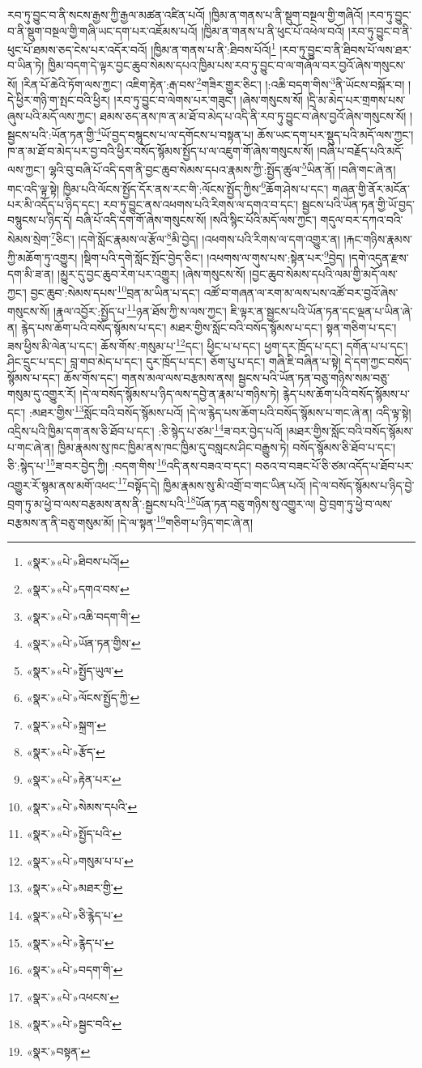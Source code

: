 རབ་ཏུ་བྱུང་བ་ནི་སངས་རྒྱས་ཀྱི་རྒྱལ་མཚན་འཛིན་པའོ། །ཁྱིམ་ན་གནས་པ་ནི་སྡུག་བསྔལ་གྱི་གཞིའོ། །རབ་ཏུ་བྱུང་བ་ནི་སྡུག་བསྔལ་གྱི་གཞི་ཡང་དག་པར་འཇོམས་པའོ། །ཁྱིམ་ན་གནས་པ་ནི་ཕུང་པོ་འཕེལ་བའོ། །རབ་ཏུ་བྱུང་བ་ནི་ཕུང་པོ་ཐམས་ཅད་ངེས་པར་འདོར་བའོ། །ཁྱིམ་ན་གནས་པ་ནི་:ཐིབས་པོའོ།\footnote{«སྣར་»«པེ་»ཐིབས་པའོ།} །རབ་ཏུ་བྱུང་བ་ནི་ཐིབས་པོ་ལས་ཐར་བ་ཡིན་ཏེ། ཁྱིམ་བདག་དེ་ལྟར་བྱང་ཆུབ་སེམས་དཔའ་ཁྱིམ་པས་རབ་ཏུ་བྱུང་བ་ལ་གཞོལ་བར་བྱའོ་ཞེས་གསུངས་སོ། །རིན་པོ་ཆེའི་ཏོག་ལས་ཀྱང་། འཇིག་རྟེན་:རྒ་བས་\footnote{«སྣར་»«པེ་»དགའ་བས་}གཟིར་གྱུར་ཅིང་། །:འཆི་བདག་གིས་\footnote{«སྣར་»«པེ་»འཆི་བདག་གི་}ནི་ཡོངས་བསྐོར་བ། །དེ་ཕྱིར་གཉི་ག་སྤང་བའི་ཕྱིར། །རབ་ཏུ་བྱུང་བ་ལེགས་པར་གཟུང་། །ཞེས་གསུངས་སོ། །དྲི་མ་མེད་པར་གྲགས་པས་ཞུས་པའི་མདོ་ལས་ཀྱང་། ཐམས་ཅད་ནས་ཁ་ན་མ་ཐོ་བ་མེད་པ་འདི་ནི་རབ་ཏུ་བྱུང་བ་ཞེས་བྱའོ་ཞེས་གསུངས་སོ། །སྦྱངས་པའི་:ཡོན་ཏན་གྱི་\footnote{«སྣར་»«པེ་»ཡོན་ཏན་གྱིས་}ཡོ་བྱད་བསྙུངས་པ་ལ་དགོངས་པ་བསྟན་པ། ཆོས་ཡང་དག་པར་སྡུད་པའི་མདོ་ལས་ཀྱང་། ཁ་ན་མ་ཐོ་བ་མེད་པར་བྱ་བའི་ཕྱིར་བསོད་སྙོམས་སྤྱོད་པ་ལ་འཇུག་གོ་ཞེས་གསུངས་སོ། །བཞི་པ་བརྗོད་པའི་མདོ་ལས་ཀྱང་། ལྷའི་བུ་བཞི་པོ་འདི་དག་ནི་བྱང་ཆུབ་སེམས་དཔའ་རྣམས་ཀྱི་:སྤྱོད་ཚུལ་\footnote{«སྣར་»«པེ་»སྤྱོད་ཡུལ་}ཡིན་ནོ། །བཞི་གང་ཞེ་ན། གང་འདི་ལྟ་སྟེ། ཁྱིམ་པའི་ལོངས་སྤྱོད་དོར་ནས་རང་གི་:ལོངས་སྤྱོད་ཀྱིས་\footnote{«སྣར་»«པེ་»ལོངས་སྤྱོད་ཀྱི་}ཆོག་ཤེས་པ་དང་། གཞན་གྱི་ནོར་མངོན་པར་མི་འདོད་པ་ཉིད་དང་། རབ་ཏུ་བྱུང་ནས་འཕགས་པའི་རིགས་ལ་དགའ་བ་དང་། སྦྱངས་པའི་ཡོན་ཏན་གྱི་ཡོ་བྱད་བསྙུངས་པ་ཉིད་དེ། བཞི་པོ་འདི་དག་གོ་ཞེས་གསུངས་སོ། །སའི་སྙིང་པོའི་མདོ་ལས་ཀྱང་། གདུལ་བར་དཀའ་བའི་སེམས་སྲེག་\footnote{«སྣར་»«པེ་»སྐྲག་}ཅིང་། །དགེ་སློང་རྣམས་ལ་རྩོལ་\footnote{«སྣར་»«པེ་»རྩོད་}མི་བྱེད། །འཕགས་པའི་རིགས་ལ་དག་འགྱུར་ན། །རྐང་གཉིས་རྣམས་ཀྱི་མཆོག་ཏུ་འགྱུར། །སྡིག་པའི་དགེ་སློང་སྤོང་བྱེད་ཅིང་། །འཕགས་ལ་གུས་པས་:སྟེན་པར་\footnote{«སྣར་»«པེ་»རྟེན་པར་}བྱེད། །དགེ་འདུན་རྫས་དག་མི་ཟ་ན། །མྱུར་དུ་བྱང་ཆུབ་རེག་པར་འགྱུར། །ཞེས་གསུངས་སོ། །བྱང་ཆུབ་སེམས་དཔའི་ལམ་གྱི་མདོ་ལས་ཀྱང་། བྱང་ཆུབ་:སེམས་དཔས་\footnote{«སྣར་»«པེ་»སེམས་དཔའི་}བྲན་མ་ཡིན་པ་དང་། འཚོ་བ་གཞན་ལ་རག་མ་ལས་པས་འཚོ་བར་བྱའོ་ཞེས་གསུངས་སོ། །རྣལ་འབྱོར་:སྤྱོད་པ་\footnote{«སྣར་»«པེ་»སྤྱོད་པའི་}ཉན་ཐོས་ཀྱི་ས་ལས་ཀྱང་། ཇི་ལྟར་ན་སྦྱངས་པའི་ཡོན་ཏན་དང་ལྡན་པ་ཡིན་ཞེ་ན། རྙེད་པས་ཆོག་པའི་བསོད་སྙོམས་པ་དང་། མཐར་གྱིས་སློང་བའི་བསོད་སྙོམས་པ་དང་། སྟན་གཅིག་པ་དང་། ཟས་ཕྱིས་མི་ལེན་པ་དང་། ཆོས་གོས་:གསུམ་པ་\footnote{«སྣར་»«པེ་»གསུམ་པ་པ་}དང་། ཕྱིང་པ་པ་དང་། ཕྱག་དར་ཁྲོད་པ་དང་། དགོན་པ་པ་དང་། ཤིང་དྲུང་པ་དང་། བླ་གབ་མེད་པ་དང་། དུར་ཁྲོད་པ་དང་། ཅོག་པུ་པ་དང་། གཞི་ཇི་བཞིན་པ་སྟེ། དེ་དག་ཀྱང་བསོད་སྙོམས་པ་དང་། ཆོས་གོས་དང་། གནས་མལ་ལས་བརྩམས་ནས། སྦྱངས་པའི་ཡོན་ཏན་བཅུ་གཉིས་སམ་བཅུ་གསུམ་དུ་འགྱུར་རོ། །དེ་ལ་བསོད་སྙོམས་པ་ཉིད་ལས་དབྱེ་ན་རྣམ་པ་གཉིས་ཏེ། རྙེད་པས་ཆོག་པའི་བསོད་སྙོམས་པ་དང་། :མཐར་གྱིས་\footnote{«སྣར་»«པེ་»མཐར་གྱི་}སློང་བའི་བསོད་སྙོམས་པའོ། །དེ་ལ་རྙེད་པས་ཆོག་པའི་བསོད་སྙོམས་པ་གང་ཞེ་ན། འདི་ལྟ་སྟེ། འདྲིས་པའི་ཁྱིམ་དག་ནས་ཅི་ཐོབ་པ་དང་། :ཅི་སྙེད་པ་ཙམ་\footnote{«སྣར་»«པེ་»ཅི་རྙེད་པ་}ཟ་བར་བྱེད་པའོ། །མཐར་གྱིས་སློང་བའི་བསོད་སྙོམས་པ་གང་ཞེ་ན། ཁྱིམ་རྣམས་སུ་ཁང་ཁྱིམ་ནས་ཁང་ཁྱིམ་དུ་བསླངས་ཤིང་བརྒྱུས་ཏེ། བསོད་སྙོམས་ཅི་ཐོབ་པ་དང་། ཅི་:སྙེད་པ་\footnote{«སྣར་»«པེ་»རྙེད་པ་}ཟ་བར་བྱེད་ཀྱི། :བདག་གིས་\footnote{«སྣར་»«པེ་»བདག་གི་}འདི་ནས་བཟའ་བ་དང་། བཅའ་བ་བཟང་པོ་ཅི་ཙམ་འདོད་པ་ཐོབ་པར་འགྱུར་རོ་སྙམ་ནས་མགོ་འཕང་\footnote{«སྣར་»«པེ་»འཕངས་}བསྟོད་དེ། ཁྱིམ་རྣམས་སུ་མི་འགྲོ་བ་གང་ཡིན་པའོ། །དེ་ལ་བསོད་སྙོམས་པ་ཉིད་བྱེ་བྲག་ཏུ་མ་ཕྱེ་བ་ལས་བརྩམས་ནས་ནི་:སྦྱངས་པའི་\footnote{«སྣར་»«པེ་»སྦྱང་བའི་}ཡོན་ཏན་བཅུ་གཉིས་སུ་འགྱུར་ལ། བྱེ་བྲག་ཏུ་ཕྱེ་བ་ལས་བརྩམས་ན་ནི་བཅུ་གསུམ་མོ། །དེ་ལ་སྟན་\footnote{«སྣར་»བསྟན་}གཅིག་པ་ཉིད་གང་ཞེ་ན། 